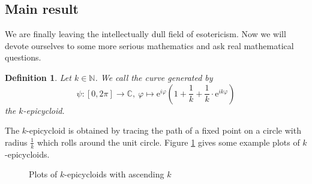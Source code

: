 \documentclass{article}
\newtheorem{defi}{Definition}
\newcommand{\N}{\mathbb{N}}
\newcommand{\C}{\mathbb{C}}
\newcommand{\e}{\mathrm{e}}
\begin{document}
\subsection{Main result}
We are finally leaving the intellectually dull field of esotericism. Now we will devote ourselves to some more serious mathematics and ask real mathematical questions.
\begin{defi}
    Let $k\in\N$. We call the curve generated by
    \begin{equation}\label{eq:epi}
        \psi\colon[0,2\pi]\to\C,\ \varphi\mapsto\e^{i\varphi}\left(1+\frac{1}{k}+\frac{1}{k}\cdot\e^{ik\varphi}\right)
    \end{equation}
    the $k$-epicycloid.
\end{defi}
The $k$-epicycloid is obtained by tracing the path of a fixed point on a circle with radius $\frac{1}{k}$ which rolls around the unit circle. 
Figure \ref{fig:epicycloids} gives some example plots of $k$-epicycloids.
\begin{figure}[h]
    \centering
    \hspace{1.2cm}
    \hspace{1.2cm}
    \hspace{1.2cm}
    \caption{Plots of $k$-epicycloids  with ascending $k$}
    \label{fig:epicycloids}
\end{figure}\newline\noindent
\end{document}
